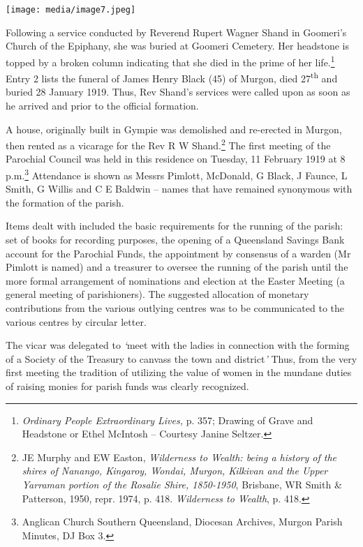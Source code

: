 \texttt{[image: media/image7.jpeg]}

Following a service conducted by Reverend Rupert Wagner Shand in
Goomeri's Church of the Epiphany, she was buried at Goomeri Cemetery.
Her headstone is topped by a broken column indicating that she died in
the prime of her life.\footnote{\emph{Ordinary People Extraordinary
  Lives,} p. 357; Drawing of Grave and Headstone or Ethel McIntosh --
  Courtesy Janine Seltzer.} Entry 2 lists the funeral of James Henry
Black (45) of Murgon, died 27\textsuperscript{th} and buried 28 January
1919. Thus, Rev Shand's services were called upon as soon as he arrived
and prior to the official formation.

A house, originally built in Gympie was demolished and re-erected in
Murgon, then rented as a vicarage for the Rev R W Shand.\footnote{JE
  Murphy and EW Easton, \emph{Wilderness to Wealth: being a history of
  the shires of Nanango, Kingaroy, Wondai, Murgon, Kilkivan and the
  Upper Yarraman portion of the Rosalie Shire, 1850-1950}, Brisbane, WR
  Smith \& Patterson, 1950, repr. 1974, p. 418. \emph{Wilderness to
  Wealth}, p. 418.} The first meeting of the Parochial Council was held
in this residence on Tuesday, 11 February 1919 at 8 p.m.\footnote{Anglican
  Church Southern Queensland, Diocesan Archives, Murgon Parish Minutes,
  DJ Box 3.} Attendance is shown as Messrs Pimlott, McDonald, G Black, J
Faunce, L Smith, G Willis and C E Baldwin -- names that have remained
synonymous with the formation of the parish.

Items dealt with included the basic requirements for the running of the
parish: set of books for recording purposes, the opening of a Queensland
Savings Bank account for the Parochial Funds, the appointment by
consensus of a warden (Mr Pimlott is named) and a treasurer to oversee
the running of the parish until the more formal arrangement of
nominations and election at the Easter Meeting (a general meeting of
parishioners). The suggested allocation of monetary contributions from
the various outlying centres was to be communicated to the various
centres by circular letter.

The vicar was delegated to \emph{`}meet with the ladies in connection
with the forming of a Society of the Treasury to canvass the town and
district\emph{'} Thus, from the very first meeting the tradition of
utilizing the value of women in the mundane duties of raising monies for
parish funds was clearly recognized.

